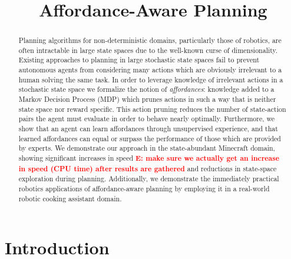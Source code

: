 \documentclass[conference]{IEEEtran}
\newcommand{\enote}[1]{\textcolor{Red}{\textbf{E: #1}}}
\begin{document}
\title{Affordance-Aware Planning}

\author{
}

\maketitle

\begin{abstract}
Planning algorithms for non-deterministic domains, particularly those of robotics, are often
intractable in large state spaces due to the well-known curse of
dimensionality. Existing approaches to planning in large stochastic state spaces fail to
prevent autonomous agents from considering many actions which are
obviously irrelevant to a human solving the same task. In order to leverage knowledge of irrelevant actions in a stochastic state space we formalize the notion of {\em affordances}: knowledge added to a Markov Decision Process (MDP) which prunes actions in such a way that is neither state space nor reward specific. This action pruning reduces the number of state-action pairs the agent must evaluate
in order to behave nearly optimally. Furthermore, we show that an
agent can learn affordances through unsupervised experience, and that learned
affordances can equal or surpass the performance of those which are
provided by experts. We demonstrate our approach in the state-abundant
Minecraft domain, showing significant increases in speed \enote{make sure we actually get an increase in speed (CPU time) after results are gathered }and reductions in state-space exploration during
planning. Additionally, we demonstrate the immediately practical robotics applications of affordance-aware planning by employing it in a real-world
robotic cooking assistant domain. 

\end{abstract}

\IEEEpeerreviewmaketitle

\section{Introduction}
\label{sec:introduction}
\end{document}

